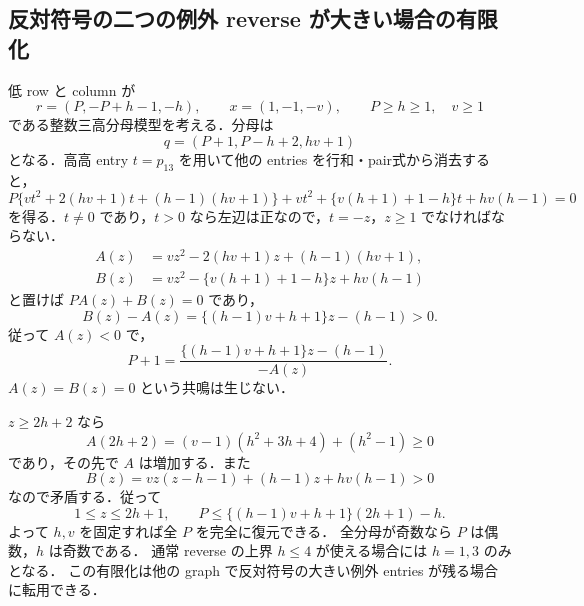\subsection{反対符号の二つの例外 reverse が大きい場合の有限化}
\label{fc17:tail-note}

低 row と column が
\[
 r=(P,-P+h-1,-h),\qquad x=(1,-1,-v),\qquad
 P\ge h\ge1,\quad v\ge1
\]
である整数三高分母模型を考える．分母は
\[
 q=(P+1,P-h+2,hv+1)
\]
となる．高高 entry $t=p_{13}$ を用いて他の entries を行和・pair式から消去すると，
\[
 P\{vt^2+2(hv+1)t+(h-1)(hv+1)\}
 +vt^2+\{v(h+1)+1-h\}t+hv(h-1)=0
\]
を得る．$t\ne0$ であり，$t>0$ なら左辺は正なので，$t=-z$，$z\ge1$ でなければならない．
\[
 \begin{split}
 A(z)&=vz^2-2(hv+1)z+(h-1)(hv+1),\\
 B(z)&=vz^2-\{v(h+1)+1-h\}z+hv(h-1)
 \end{split}
\]
と置けば $PA(z)+B(z)=0$ であり，
\[
 B(z)-A(z)=\{(h-1)v+h+1\}z-(h-1)>0.
\]
従って $A(z)<0$ で，
\[
 P+1=\frac{\{(h-1)v+h+1\}z-(h-1)}{-A(z)}.
\]
$A(z)=B(z)=0$ という共鳴は生じない．

$z\ge2h+2$ なら
\[
 A(2h+2)=(v-1)(h^2+3h+4)+(h^2-1)\ge0
\]
であり，その先で $A$ は増加する．また
\[
 B(z)=vz(z-h-1)+(h-1)z+hv(h-1)>0
\]
なので矛盾する．従って
\[
 1\le z\le2h+1,\qquad
 P\le\{(h-1)v+h+1\}(2h+1)-h.
\]
よって $h,v$ を固定すれば全 $P$ を完全に復元できる．
全分母が奇数なら $P$ は偶数，$h$ は奇数である．
通常 reverse の上界 $h\le4$ が使える場合には $h=1,3$ のみとなる．
この有限化は他の graph で反対符号の大きい例外 entries が残る場合に転用できる．
